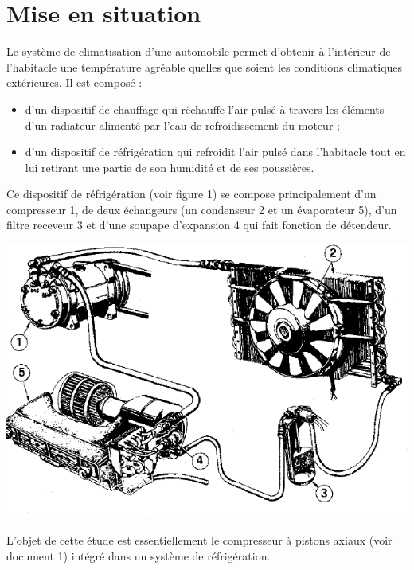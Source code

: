 \documentclass[11pt,oneside]{article}
\begin{document}
\section*{Mise en situation}
\begin{minipage}[c]{.5\linewidth}
Le système de climatisation d'une automobile permet
d'obtenir à l'intérieur de l'habitacle une température
agréable quelles que soient les conditions climatiques
extérieures. Il est composé :
\begin{itemize}
\item d'un dispositif de chauffage qui réchauffe l'air pulsé
à travers les éléments d'un radiateur alimenté par
l'eau de refroidissement du moteur ;
\item d'un dispositif de réfrigération qui refroidit l'air pulsé
dans l'habitacle tout en lui retirant une partie de son
humidité et de ses poussières.
\end{itemize}
Ce dispositif de réfrigération (voir figure 1) se
compose principalement d'un compresseur 1, de deux
échangeurs (un condenseur 2 et un évaporateur 5),
d'un filtre receveur 3 et d'une soupape d'expansion 4
qui fait fonction de détendeur.

\end{minipage}\hfill
\begin{minipage}[c]{.45\linewidth}
\begin{center}
\includegraphics[width=.9\textwidth]{png/compresseur}
\end{center}
\end{minipage}

\vspace{.25cm}

L'objet de cette étude est essentiellement le
compresseur à pistons axiaux (voir document 1) intégré dans un système de réfrigération.
\end{document}
